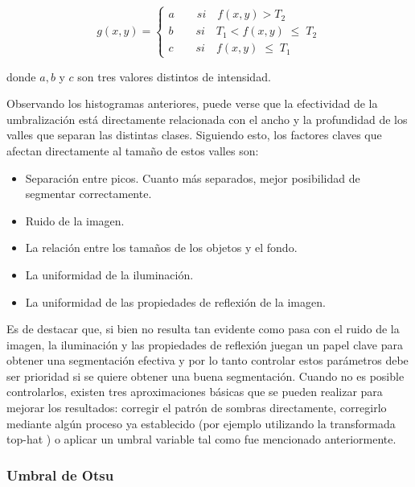 \begin{equation}
g(x,y) = \left\{
\begin{array}{l}
\displaystyle a{\qquad}si{\quad}f(x,y) > {T_2}\\
\displaystyle b{\qquad}si{\quad}{T_1} < f(x,y)\;{\leq}\;{T_2}\\
\displaystyle c{\qquad}si{\quad}f(x,y)\;{\leq}\;{T_1}
\end{array} 
\right.
\label{eq:xdef3}
\end{equation}

donde $a,b$ y $c $ son tres valores distintos de intensidad.

Observando los histogramas anteriores, puede verse que la efectividad de la umbralización está directamente relacionada con el ancho y la profundidad de los valles que separan las distintas clases. Siguiendo esto, los factores claves que afectan directamente al tamaño de estos valles son:
\begin{itemize}
\item Separación entre picos. Cuanto más separados, mejor posibilidad de segmentar correctamente.
\item Ruido de la imagen.
\item La relación entre los tamaños de los objetos y el fondo.
\item La uniformidad de la iluminación.
\item La uniformidad de las propiedades de reflexión de la imagen.
\end{itemize}

Es de destacar que, si bien no resulta tan evidente como pasa con el ruido de la imagen, la iluminación y las propiedades de reflexión juegan un papel clave para obtener una segmentación efectiva y por lo tanto controlar estos parámetros debe ser prioridad si se quiere obtener una buena segmentación. Cuando no es posible controlarlos, existen tres aproximaciones básicas que se pueden realizar para mejorar los resultados: corregir el patrón de sombras directamente, corregirlo mediante algún proceso ya establecido (por ejemplo utilizando la transformada top-hat \cite{tophat}) o aplicar un umbral variable tal como fue mencionado anteriormente.

\subsubsection{Umbral de Otsu}


